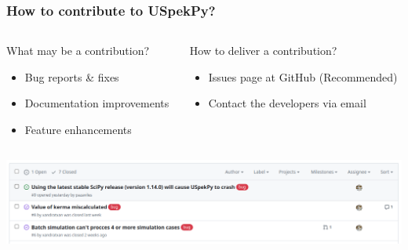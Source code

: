 \documentclass{beamer}
\newcommand{\highlight}[1]{{\color{blue} #1}}
\begin{document}
	\begin{frame}
		\frametitle{How to contribute to USpekPy?}
		\begin{columns}[t]
			\begin{column}{0.45\textwidth}
				\begin{block}{What may be a contribution?}
					\begin{itemize}
						\item Bug reports \& fixes
						\item Documentation improvements
						\item Feature enhancements
					\end{itemize}
				\end{block}
			\end{column}
			\begin{column}{0.45\textwidth}
				\begin{block}{How to deliver a contribution?}
					\begin{itemize}
						\item \highlight{Issues page} at GitHub (Recommended) \href{https://github.com/lmri-met/uspekpy/issues}{}
						\item Contact the developers \highlight{via email}
					\end{itemize}
				\end{block}	
			\end{column}
		\end{columns}
		\bigskip
		\includegraphics[width=\textwidth]{issues_list}
	\end{frame}
	
\end{document}
